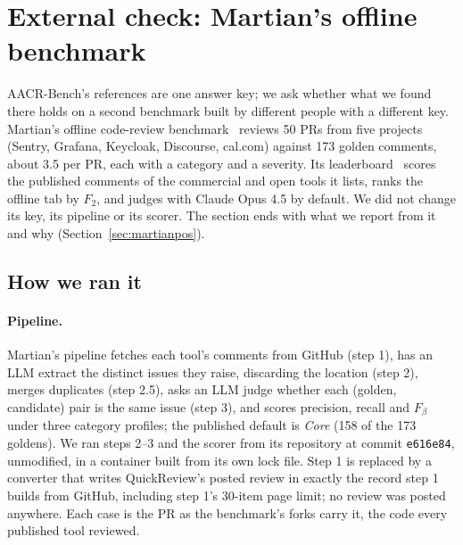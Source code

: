 \documentclass[11pt,a4paper]{article}
\newcommand{\qcr}{QuickReview}
\newcommand{\code}[1]{\texttt{#1}}
\begin{document}
\section{External check: Martian's offline benchmark}
\label{sec:martian}

AACR-Bench's references are one answer key; we ask whether what we found
there holds on a second benchmark built by different people with a different
key. Martian's offline code-review benchmark~\cite{martianbench} reviews 50
PRs from five projects (Sentry, Grafana, Keycloak, Discourse, cal.com) against
173 golden comments, about 3.5 per PR, each with a category and a severity.
Its leaderboard~\cite{martiansite} scores the published comments of the
commercial and open tools it lists, ranks the offline tab by $F_2$, and judges
with Claude Opus 4.5 by default. We did not change its key, its pipeline or
its scorer. The section ends with what we report from it and why
(Section~\ref{sec:martianpos}).

\subsection{How we ran it}

\paragraph{Pipeline.} Martian's pipeline fetches each tool's comments from
GitHub (step 1), has an LLM extract the distinct issues they raise, discarding
the location (step 2), merges duplicates (step 2.5), asks an LLM judge whether
each (golden, candidate) pair is the same issue (step 3), and scores
precision, recall and $F_\beta$ under three category profiles; the published
default is \emph{Core} (158 of the 173 goldens). We ran steps 2--3 and the
scorer from its repository at commit \code{e616e84}, unmodified, in a container
built from its own lock file. Step 1 is replaced by a converter that writes
\qcr{}'s posted review in exactly the record step 1 builds from GitHub,
including step 1's 30-item page limit; no review was posted anywhere. Each
case is the PR as the benchmark's forks carry it, the code every published
tool reviewed.
\end{document}
